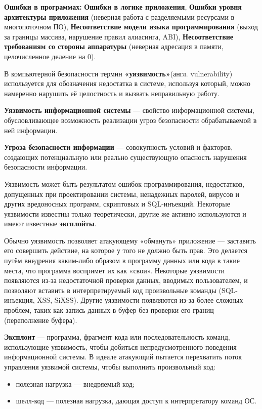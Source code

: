 \textbf{Ошибки в программах:}
\textbf{Ошибки в логике приложения}, \textbf{Ошибки уровня архитектуры приложения}
(неверная работа с разделяемыми ресурсами в многопоточном ПО), \textbf{Несоответствие модели языка программирования}
(выход за границы массива, нарушение правил алиасинга, ABI),\textbf{ Несоответствие требованиям со стороны аппаратуры}
(неверная адресация в памяти, целочисленное деление на 0).

В компьютерной безопасности термин \textbf{«уязвимость»}(англ. vulnerability) используется для обозначения недостатка в системе, используя который, можно намеренно нарушить её целостность и вызвать неправильную работу. 

\textbf{Уязвимость информационной системы} —
свойство информационной системы,
обусловливающее возможность
реализации угроз безопасности
обрабатываемой в ней информации.

\textbf{Угроза безопасности информации} —
совокупность условий и факторов,
создающих потенциальную или реально
существующую опасность нарушения
безопасности информации.

Уязвимость может быть результатом ошибок программирования, недостатков, допущенных при проектировании системы, ненадежных паролей, вирусов и других вредоносных программ, скриптовых и SQL-инъекций. Некоторые уязвимости известны только теоретически, другие же активно используются и имеют известные \textbf{эксплойты}.

Обычно уязвимость позволяет атакующему «обмануть» приложение — заставить его совершить действие, на которое у того не должно быть прав. Это делается путём внедрения каким-либо образом в программу данных или кода в такие места, что программа воспримет их как «свои». Некоторые уязвимости появляются из-за недостаточной проверки данных, вводимых пользователем, и позволяют вставить в интерпретируемый код произвольные команды (SQL-инъекция, XSS, SiXSS). Другие уязвимости появляются из-за более сложных проблем, таких как запись данных в буфер без проверки его границ (переполнение буфера).

\textbf{Эксплоит} — программа, фрагмент кода или последовательность команд, использующие уязвимость, чтобы добиться непредусмотренного поведения информационной системы.
В идеале атакующий пытается перехватить поток управления уязвимой системы, чтобы выполнить произвольный код:
\begin{itemize}
    \item полезная нагрузка — внедряемый код;
    \item шелл-код — полезная нагрузка, дающая доступ к интерпретатору команд ОС.
\end{itemize}